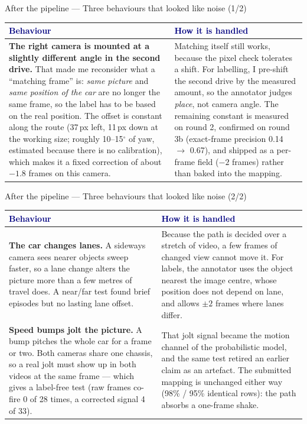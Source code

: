 \documentclass[10pt,aspectratio=169]{beamer}
\begin{document}
\begin{frame}{After the pipeline --- Three behaviours that looked like noise (1/2)}
\footnotesize
\setlength{\tabcolsep}{5pt}
\begin{tabularx}{\textwidth}{@{}>{\raggedright\arraybackslash}p{}X@{}}
\toprule
\textcolor{navy}{\textbf{Behaviour}} & \textcolor{navy}{\textbf{How it is handled}} \\
\midrule
\textbf{The right camera is mounted at a slightly different angle in the second drive.} That made me reconsider what a ``matching frame'' is: \emph{same picture} and \emph{same position of the car} are no longer the same frame, so the label has to be based on the real position. The offset is constant along the route (37\,px left, 11\,px down at the working size; roughly 10--15$^\circ$ of yaw, estimated because there is no calibration), which makes it a fixed correction of about $-1.8$ frames on this camera. & Matching itself still works, because the pixel check tolerates a shift. For labelling, I pre-shift the second drive by the measured amount, so the annotator judges \emph{place}, not camera angle. The remaining constant is measured on round 2, confirmed on round 3b (exact-frame precision 0.14 $\to$ 0.67), and shipped as a per-frame field ($-2$ frames) rather than baked into the mapping. \\
\bottomrule
\end{tabularx}
\end{frame}

\begin{frame}{After the pipeline --- Three behaviours that looked like noise (2/2)}
\footnotesize
\setlength{\tabcolsep}{5pt}
\begin{tabularx}{\textwidth}{@{}>{\raggedright\arraybackslash}p{}X@{}}
\toprule
\textcolor{navy}{\textbf{Behaviour}} & \textcolor{navy}{\textbf{How it is handled}} \\
\midrule
\textbf{The car changes lanes.} A sideways camera sees nearer objects sweep faster, so a lane change alters the picture more than a few metres of travel does. A near/far test found brief episodes but no lasting lane offset. & Because the path is decided over a stretch of video, a few frames of changed view cannot move it. For labels, the annotator uses the object nearest the image centre, whose position does not depend on lane, and allows $\pm2$ frames where lanes differ. \\
\addlinespace
\textbf{Speed bumps jolt the picture.} A bump pitches the whole car for a frame or two. Both cameras share one chassis, so a real jolt must show up in both videos at the same frame --- which gives a label-free test (raw frames co-fire 0 of 28 times, a corrected signal 4 of 33). & That jolt signal became the motion channel of the probabilistic model, and the same test retired an earlier claim as an artefact. The submitted mapping is unchanged either way (98\% / 95\% identical rows): the path absorbs a one-frame shake. \\
\bottomrule
\end{tabularx}
\end{frame}
\end{document}
